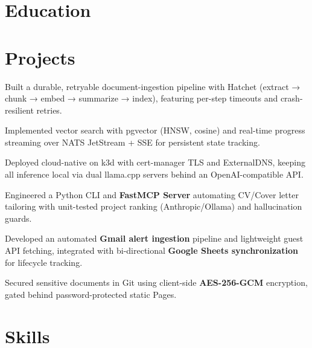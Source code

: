 \documentclass[10pt,a4paper]{resume}
\begin{document}
\section{Education}

\vspace{2pt}

\section{Projects}

\bullets
  \item Built a durable, retryable document-ingestion pipeline with Hatchet (extract → chunk → embed → summarize → index), featuring per-step timeouts and crash-resilient retries.
  \item Implemented vector search with pgvector (HNSW, cosine) and real-time progress streaming over NATS JetStream + SSE for persistent state tracking.
  \item Deployed cloud-native on k3d with cert-manager TLS and ExternalDNS, keeping all inference local via dual llama.cpp servers behind an OpenAI-compatible API.
\bulletsend
\vspace{1.0pt}
\bullets
  \item Engineered a Python CLI and \textbf{FastMCP Server} automating CV/Cover letter tailoring with unit-tested project ranking (Anthropic/Ollama) and hallucination guards.
  \item Developed an automated \textbf{Gmail alert ingestion} pipeline and lightweight guest API fetching, integrated with bi-directional \textbf{Google Sheets synchronization} for lifecycle tracking.
  \item Secured sensitive documents in Git using client-side \textbf{AES-256-GCM} encryption, gated behind password-protected static Pages.
\bulletsend

\section{Skills}
\end{document}
